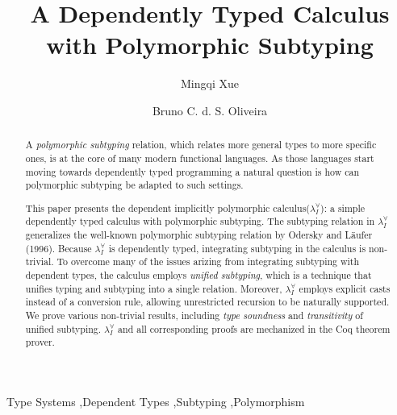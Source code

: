 \documentclass[authoryear]{elsarticle}
\title{A Dependently Typed Calculus with Polymorphic Subtyping}
\author{Mingqi Xue}
\author{Bruno C. d. S. Oliveira}
\newcommand{\system}[0]{the dependent implicitly polymorphic calculus\xspace}
\newcommand{\name}[0]{$\lambda_{I}^{\forall}$\xspace}
\begin{document}
\begin{abstract}
  A \emph{polymorphic subtyping} relation, which relates more general types
  to more specific ones, is at the core of many modern functional languages.
  As those languages start moving towards dependently typed programming a
  natural question is how can polymorphic subtyping be adapted to such settings.

  This paper presents \system (\name): a simple dependently typed calculus
  with polymorphic subtyping. The subtyping relation in \name
  generalizes the well-known polymorphic subtyping relation by
  Odersky and L\"aufer (1996). Because \name is dependently typed,
  integrating subtyping in the calculus is non-trivial. To overcome
  many of the issues arizing from integrating subtyping with dependent
  types, the calculus employs \emph{unified subtyping}, which is a technique
  that unifies typing and subtyping into a single relation. Moreover, \name
  employs explicit casts instead of a conversion rule, allowing
  unrestricted recursion to be naturally supported.
  We prove various non-trivial results, including \emph{type soundness} and \emph{transitivity}
  of unified subtyping. \name and all corresponding proofs
  are mechanized in the Coq theorem prover.
\end{abstract}


\begin{keyword}
  Type Systems \sep Dependent Types \sep Subtyping \sep Polymorphism
\end{keyword}

\maketitle









% 


\end{document}
